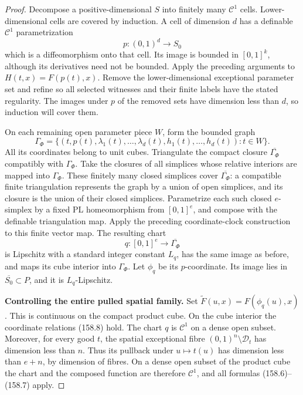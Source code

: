 \begin{proof}
Decompose a positive-dimensional \(S\) into finitely many
\(\mathcal C^1\) cells. Lower-dimensional cells are covered by
induction. A cell of dimension \(d\) has a definable
\(\mathcal C^1\) parametrization
\[
 p:(0,1)^d\longrightarrow S_0
\]
which is a diffeomorphism onto that cell. Its image is bounded
in \([0,1]^k\), although its derivatives need not be bounded.
Apply the preceding arguments to \(H(t,x)=F(p(t),x)\).
Remove the lower-dimensional exceptional parameter set and
refine so all selected witnesses and their finite labels have
the stated regularity. The images under \(p\) of the removed
sets have dimension less than \(d\), so induction will cover
them.

On each remaining open parameter piece \(W\), form the bounded
graph
\[
 \Gamma_\Phi=
 \{(t,p(t),\lambda_1(t),\ldots,\lambda_d(t),
                    h_1(t),\ldots,h_d(t)):t\in W\}.
 \tag{158.8}
\]
All its coordinates belong to unit cubes. Triangulate the compact
closure \(\overline{\Gamma_\Phi}\) compatibly with
\(\Gamma_\Phi\). Take the closures of all simplices whose relative
interiors are mapped into \(\Gamma_\Phi\). These finitely many
closed simplices cover \(\overline{\Gamma_\Phi}\): a compatible
finite triangulation represents the graph by a union of open
simplices, and its closure is the union of their closed
simplices. Parametrize each such closed \(e\)-simplex by a fixed
PL homeomorphism from \([0,1]^e\), and compose with the definable
triangulation map. Apply the preceding coordinate-clock
construction to this finite vector map. The resulting chart
\[
 q:[0,1]^e\longrightarrow\overline{\Gamma_\Phi}
\]
is Lipschitz with a standard integer constant \(L_q\), has the
same image as before, and maps its cube interior into
\(\Gamma_\Phi\). Let \(\phi_q\) be its \(p\)-coordinate.
Its image lies in \(\overline{S_0}\subset P\), and it is
\(L_q\)-Lipschitz.

\textbf{Controlling the entire pulled spatial family.}
Set \(\widetilde F(u,x)=F(\phi_q(u),x)\). This is continuous on
the compact product cube. On the cube interior the coordinate
relations (158.8) hold. The chart \(q\) is \(\mathcal C^1\) on
a dense open subset. Moreover, for every good \(t\), the spatial
exceptional fibre \((0,1)^n\setminus\mathcal D_t\) has dimension
less than \(n\). Thus its pullback under \(u\mapsto t(u)\) has
dimension less than \(e+n\), by dimension of fibres. On a dense
open subset of the product cube the chart and the composed
function are therefore \(\mathcal C^1\), and all formulas
(158.6)--(158.7) apply.


\end{proof}
